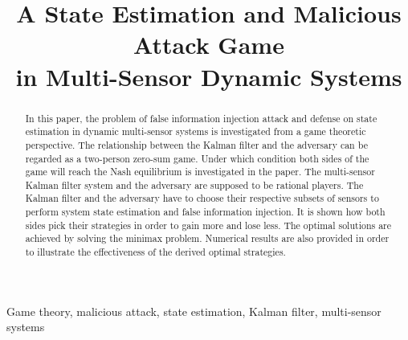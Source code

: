 \documentclass{article}
\title{A  State Estimation and Malicious Attack Game \\in Multi-Sensor Dynamic Systems}
\begin{document}
\newtheorem{theorem}{Theorem}
\newtheorem{proposition}{Proposition}
\theoremstyle{definition}
\newcommand{\beq}{}
\newcommand{\beqa}{}
\newcommand{\nn}{\nonumber}
\maketitle
\begin{abstract}
In this paper, the problem of false information injection attack and defense on state estimation  in dynamic multi-sensor systems is investigated from a game theoretic perspective. The relationship between the Kalman filter  and the adversary can be regarded as a two-person zero-sum game. Under which condition both sides of the game will reach the Nash equilibrium is investigated in the  paper. The multi-sensor Kalman filter system and the adversary are supposed to be rational players. The Kalman filter and the adversary have to choose their respective subsets of sensors to perform system state estimation and false information injection. It is shown how both sides pick their strategies in order  to gain more and lose less. The optimal solutions are achieved by solving the minimax problem. Numerical results are also provided in order to illustrate the effectiveness of the derived optimal strategies.
\end{abstract}
\begin{keywords}
 Game theory, malicious attack, state estimation, Kalman filter, multi-sensor systems
\end{keywords}
\end{document}
